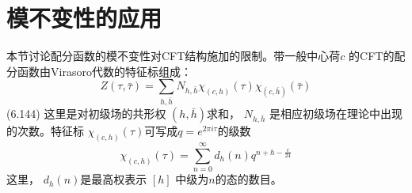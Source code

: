 \section{模不变性的应用}
本节讨论配分函数的模不变性对CFT结构施加的限制。带一般中心荷$ c$ 的CFT的配分函数由Virasoro代数的特征标组成：
\begin{equation}
	Z(\tau, \bar{\tau})=\sum_{h, \bar{h}} N_{h, \bar{h}} \chi_{(c, h)}(\tau) \chi_{(c, \bar{h})}(\bar{\tau}) 
\end{equation}\quad \quad (6.144)
这里是对初级场的共形权 $(h, \bar{h}) $求和， $N_{h, \bar{h}}$ 是相应初级场在理论中出现的次数。特征标 $\chi_{(c, h)}(\tau) $可写成$ q=e^{2 \pi i \tau} $的级数
\begin{equation}
	\chi_{(c, h)}(\tau)=\sum_{n=0}^{\infty} d_{h}(n) q^{n+h-\frac{c}{24}}
\end{equation} 
这里， $d_{h}(n) $是最高权表示 $[h]$ 中级为$n $的态的数目。

